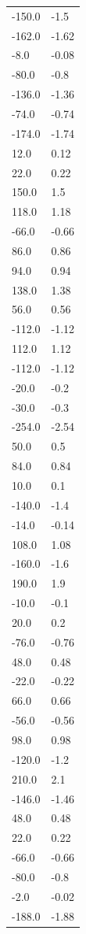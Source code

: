 \begin{longtable}{ll}
-150.0 & -1.5 \\
-162.0 & -1.62 \\
-8.0 & -0.08 \\
-80.0 & -0.8 \\
-136.0 & -1.36 \\
-74.0 & -0.74 \\
-174.0 & -1.74 \\
12.0 & 0.12 \\
22.0 & 0.22 \\
150.0 & 1.5 \\
118.0 & 1.18 \\
-66.0 & -0.66 \\
86.0 & 0.86 \\
94.0 & 0.94 \\
138.0 & 1.38 \\
56.0 & 0.56 \\
-112.0 & -1.12 \\
112.0 & 1.12 \\
-112.0 & -1.12 \\
-20.0 & -0.2 \\
-30.0 & -0.3 \\
-254.0 & -2.54 \\
50.0 & 0.5 \\
84.0 & 0.84 \\
10.0 & 0.1 \\
-140.0 & -1.4 \\
-14.0 & -0.14 \\
108.0 & 1.08 \\
-160.0 & -1.6 \\
190.0 & 1.9 \\
-10.0 & -0.1 \\
20.0 & 0.2 \\
-76.0 & -0.76 \\
48.0 & 0.48 \\
-22.0 & -0.22 \\
66.0 & 0.66 \\
-56.0 & -0.56 \\
98.0 & 0.98 \\
-120.0 & -1.2 \\
210.0 & 2.1 \\
-146.0 & -1.46 \\
48.0 & 0.48 \\
22.0 & 0.22 \\
-66.0 & -0.66 \\
-80.0 & -0.8 \\
-2.0 & -0.02 \\
-188.0 & -1.88 \\

\end{longtable}
